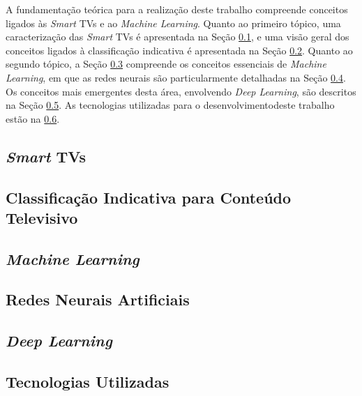 
A fundamentação teórica para a realização deste trabalho compreende conceitos ligados às  \emph{Smart} TVs e ao \emph{Machine Learning}. Quanto ao primeiro tópico, uma caracterização das \emph{Smart} TVs é apresentada na Seção \ref{sec:smarttv}, e uma visão geral dos conceitos ligados à classificação indicativa é apresentada na Seção \ref{sec:classificacaoIndicativa}. Quanto ao segundo tópico, a Seção \ref{sec:machineLearning} compreende os conceitos essenciais de \emph{Machine Learning}, em que as redes neurais são particularmente detalhadas na Seção \ref{sec:rnas}. Os conceitos mais emergentes desta área, envolvendo \emph{Deep Learning}, são descritos na Seção \ref{sec:dl}. As tecnologias utilizadas para o desenvolvimentodeste trabalho estão na \ref{sec:tecs}.

\subsection{\emph{Smart} TVs} \label{sec:smarttv}


\subsection{Classificação Indicativa para Conteúdo Televisivo} \label{sec:classificacaoIndicativa}


\subsection{\emph{Machine Learning}} \label{sec:machineLearning}


\subsection{Redes Neurais Artificiais} \label{sec:rnas}


\subsection{\emph{Deep Learning}}\label{sec:dl}


\subsection{Tecnologias Utilizadas}\label{sec:tecs}

